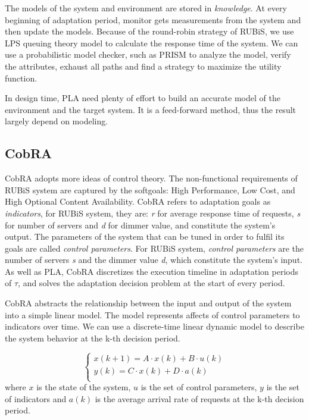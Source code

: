 \documentclass[sigconf]{acmart}
\begin{document}
The models of the system and environment are stored in \textit{knowledge}. At every beginning of adaptation period, monitor gets measurements from the system and then update the models. Because of the round-robin strategy of RUBiS, we use LPS queuing theory model\cite{lps} to calculate the response time of the system.
We can use a probabilistic model checker\cite{pmd}, such as PRISM\cite{prism} to analyze the model, verify the attributes, exhaust all paths and find a strategy to maximize the utility function. 

In design time, PLA need plenty of effort to build an accurate model of the environment and the target system. It is a feed-forward method, thus the result largely depend on modeling.

\subsection{CobRA}
CobRA adopts more ideas of control theory.
The non-functional requirements of RUBiS system are captured by the softgoals: High Performance, Low Cost, and High Optional Content Availability.
CobRA refers to adaptation goals as \textit{indicators}, for RUBiS system, they are: \textit{r} for average response time of requests, \textit{s} for number of servers and \textit{d} for dimmer value, and constitute the system's output. The parameters of the system that can be tuned in order to fulfil its goals are called \textit{control parameters}. For RUBiS system, \textit{control parameters} are the number of servers \textit{s} and the dimmer value \textit{d}, which constitute the system's input. As well as PLA, CobRA discretizes the execution timeline in adaptation periods of $\tau$, and solves the adaptation decision problem at the start of every period.

CobRA abstracts the relationship between the input and output of the system into a simple linear model. The model represents affects of control parameters to indicators over time. We can use a discrete-time linear dynamic model to describe the system behavior at the k-th decision period.

\begin{equation}
\left\{
\begin{array}{rcl}
x(k+1)=A\cdot x(k)+B\cdot u(k)\\
y(k)=C\cdot x(k)+D\cdot a(k)\\
\end{array} \right.
\end{equation}
where $x$ is the state of the system, $u$ is the set of control parameters, $y$ is the set of indicators and $a(k)$ is the average arrival rate of requests at the k-th decision period.
\end{document}
